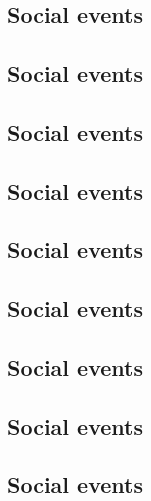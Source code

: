 \section{}
\subsection{Social events}

\clearpage

\subsection{Social events}

\clearpage

\subsection{Social events}

\clearpage

\subsection{Social events}

\clearpage

\subsection{Social events}

\clearpage

\subsection{Social events}

\clearpage

\subsection{Social events}

\clearpage

\subsection{Social events}

\clearpage

\subsection{Social events}

\clearpage


